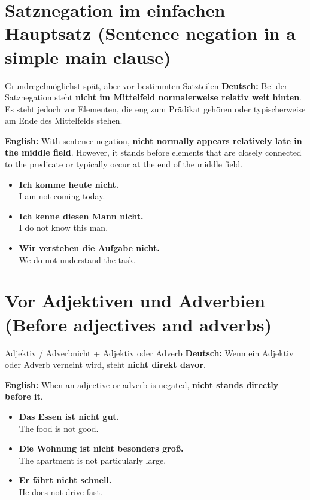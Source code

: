 \documentclass[a4paper,11pt]{article}
\newcommand{\GermanText}[1]{\textbf{Deutsch: }#1\par}
\newcommand{\EnglishText}[1]{{\small\color{SoftGray}\textbf{English: }#1\par}}
\newcommand{\ExampleItem}[2]{\item \textbf{#1}\\{\small\color{SoftGray}#2}}
\begin{document}
\section{Satznegation im einfachen Hauptsatz \textnormal{(Sentence negation in a simple main clause)}}

\begin{grammarentry}{Grundregel}{möglichst spät, aber vor bestimmten Satzteilen}
\GermanText{Bei der Satznegation steht \textbf{nicht im Mittelfeld normalerweise relativ weit hinten}. Es steht jedoch vor Elementen, die eng zum Prädikat gehören oder typischerweise am Ende des Mittelfelds stehen.}
\EnglishText{With sentence negation, \textbf{nicht normally appears relatively late in the middle field}. However, it stands before elements that are closely connected to the predicate or typically occur at the end of the middle field.}
\end{grammarentry}

\begin{exbox}
\begin{itemize}
\ExampleItem{Ich komme heute \textbf{nicht}.}{I am not coming today.}
\ExampleItem{Ich kenne diesen Mann \textbf{nicht}.}{I do not know this man.}
\ExampleItem{Wir verstehen die Aufgabe \textbf{nicht}.}{We do not understand the task.}
\end{itemize}
\end{exbox}

\section{Vor Adjektiven und Adverbien \textnormal{(Before adjectives and adverbs)}}

\begin{grammarentry}{Adjektiv / Adverb}{nicht + Adjektiv oder Adverb}
\GermanText{Wenn ein Adjektiv oder Adverb verneint wird, steht \textbf{nicht direkt davor}.}
\EnglishText{When an adjective or adverb is negated, \textbf{nicht stands directly before it}.}
\end{grammarentry}

\begin{exbox}
\begin{itemize}
\ExampleItem{Das Essen ist \textbf{nicht gut}.}{The food is not good.}
\ExampleItem{Die Wohnung ist \textbf{nicht besonders groß}.}{The apartment is not particularly large.}
\ExampleItem{Er fährt \textbf{nicht schnell}.}{He does not drive fast.}
\end{itemize}
\end{exbox}
\end{document}
